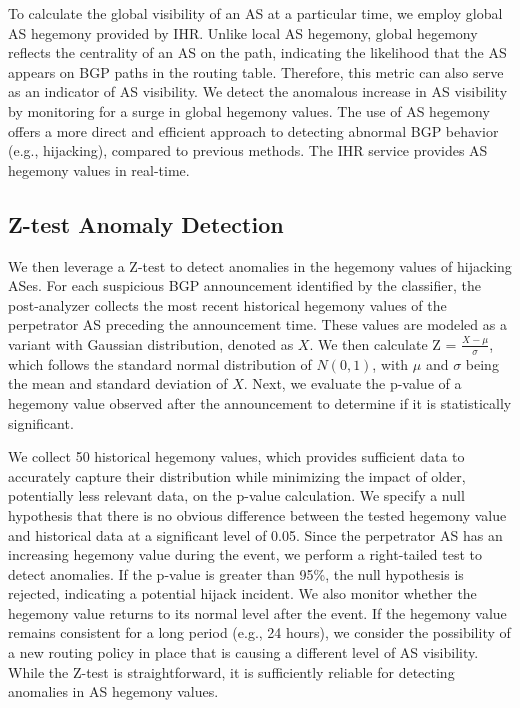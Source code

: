 To calculate the global visibility of an AS at a particular time, we employ global AS hegemony provided by IHR.
Unlike local AS hegemony, global hegemony reflects the centrality of an AS on the path, indicating the likelihood that the AS appears on BGP paths in the routing table. Therefore, this metric can also serve as an indicator of AS visibility.
We detect the anomalous increase in AS visibility by monitoring for a surge in global hegemony values.
The use of AS hegemony offers a more direct and efficient approach to detecting abnormal BGP behavior (e.g., hijacking), compared to previous methods.
The IHR service provides AS hegemony values in real-time.
\vspace{-5pt}
\subsection{Z-test Anomaly Detection}
We then leverage a Z-test to detect anomalies in the hegemony values of hijacking ASes.
For each suspicious BGP announcement identified by the classifier, the post-analyzer collects the most recent historical hegemony values of the perpetrator AS preceding the announcement time.
These values are modeled as a variant with Gaussian distribution, denoted as $X$. We then calculate Z = $\frac{X-\mu}{\sigma}$, which follows the standard normal distribution of $N(0,1)$, with $\mu$ and $\sigma$ being the mean and standard deviation of $X$. Next, we evaluate the p-value of a hegemony value observed after the announcement to determine if it is statistically significant.

We collect 50 historical hegemony values, which provides sufficient data to accurately capture their distribution while minimizing the impact of older, potentially less relevant data, on the p-value calculation.
We specify a null hypothesis that there is no obvious difference between the tested hegemony value and historical data at a significant level of 0.05.
Since the perpetrator AS has an increasing hegemony value during the event, we perform a right-tailed test to detect anomalies. If the p-value is greater than 95\%, the null hypothesis is rejected, indicating a potential hijack incident.
We also monitor whether the hegemony value returns to its normal level after the event. If the hegemony value remains consistent for a long period (e.g., 24 hours), we consider the possibility of a new routing policy in place that is causing a different level of AS visibility.
While the Z-test is straightforward, it is sufficiently reliable for detecting anomalies in AS hegemony values.



